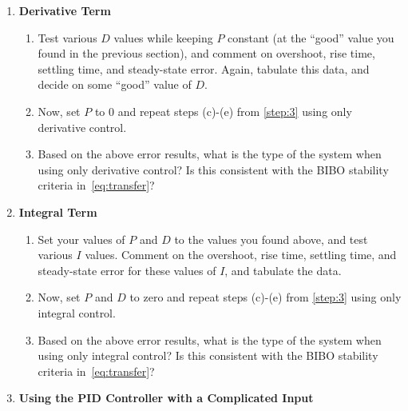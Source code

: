 \begin{enumerate}
    \item \textbf{Derivative Term}\label{step:4}
          \begin{enumerate}
              \item Test various \(D\) values while keeping \(P\) constant (at the ``good'' value you found in the previous section), and comment on overshoot, rise time, settling time, and steady-state error. Again, tabulate this data, and decide on some ``good'' value of \(D\).
              \item Now, set \(P\) to 0 and repeat steps (c)-(e) from \ref{step:3} using only derivative control.
              \item Based on the above error results, what is the type of the system when using only derivative control? Is this consistent with the BIBO stability criteria in~\eqref{eq:transfer}?
          \end{enumerate}

    \item \textbf{Integral Term}\label{step:5} \begin{enumerate}
              \item Set your values of \(P\) and \(D\) to the values you found above, and test various \(I\) values.  Comment on the overshoot,
                    rise time, settling time, and steady-state error for these values of
                    \(I\), and tabulate the data.

              \item Now, set \(P\) and
                    \(D\) to zero and repeat steps (c)-(e) from \ref{step:3} using only integral control.
              \item Based on the above error results, what is the type of the system when using only integral control? Is this consistent with the BIBO stability criteria in~\eqref{eq:transfer}?
          \end{enumerate}

    \item \textbf{Using the PID Controller with a Complicated Input}


\end{enumerate}
